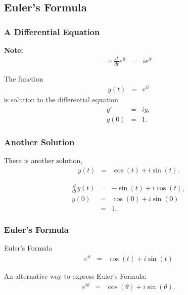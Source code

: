 {\begin{frame}
{     }\fi

    \vfill
    \vfill
    \vfill

\end{frame}

}



\subsection{Euler's Formula}

\begin{frame}
  \frametitle{A Differential Equation}

  \textbf{Note: }
  \begin{eqnarray*}
    \Rightarrow \frac{d}{dt} e^{it} & = & i e^{it}.
  \end{eqnarray*}

  The function
  \begin{eqnarray*}
    y(t) & = & e^{it}
  \end{eqnarray*}
  is \textbf{} solution to the differential equation
  \begin{eqnarray*}
    y' & = & iy, \\
    y(0) & = & 1.
  \end{eqnarray*}

\end{frame}

\begin{frame}
  \frametitle{Another Solution}

  There is another solution,
  \begin{eqnarray*}
    y(t) & = & \cos(t) + i \sin(t).
  \end{eqnarray*}

  \begin{eqnarray*}
    \frac{d}{dt} y(t) & = & -\sin(t) + i \cos(t), \\
    y(0) & = & \cos(0) + i\sin(0) \\
    & = & 1.
  \end{eqnarray*}

\end{frame}


\begin{frame}
  \frametitle{Euler's Formula}

  \begin{block}{Euler's Formula}
    \begin{eqnarray*}
      e^{it} & = & \cos(t) + i\sin(t)
    \end{eqnarray*}
  \end{block}

  \vfill

  An alternative way to express Euler's Formula:
  \begin{eqnarray*}
    e^{i\theta} & = & \cos(\theta) + i\sin(\theta).
  \end{eqnarray*}

\end{frame}

